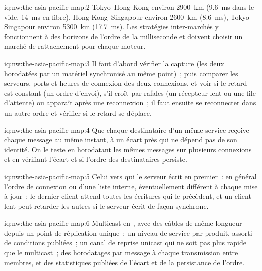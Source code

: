 \begin{solution}{iq:nw:the-asia-pacific-map:2}
Tokyo--Hong Kong environ \qty{2900}{\kilo\metre} (\qty{9.6}{\milli\second} dans le vide, \qty{14}{\milli\second} en fibre), Hong Kong--Singapour environ
\qty{2600}{\kilo\metre} (\qty{8.6}{\milli\second}), Tokyo--Singapour environ \qty{5300}{\kilo\metre} (\qty{17.7}{\milli\second}). Les stratégies inter-marchés
y fonctionnent à des horizons de l'ordre de la milliseconde et doivent choisir un marché de rattachement pour chaque moteur.
\end{solution}

\begin{solution}{iq:nw:the-asia-pacific-map:3}
Il faut d'abord vérifier la capture (les deux horodatées par un matériel synchronisé au même point)~; puis comparer les serveurs, ports et heures de connexion des deux connexions, et voir si le retard est constant (un ordre d'envoi),
s'il croît par rafales (un récepteur lent ou une file d'attente) ou apparaît après une reconnexion~; il faut ensuite se reconnecter dans un autre ordre
et vérifier si le retard se déplace.
\end{solution}

\begin{solution}{iq:nw:the-asia-pacific-map:4}
Que chaque destinataire d'un même service reçoive chaque message au même instant, à un écart près qui ne dépend pas de son identité. On le teste en horodatant
les mêmes messages sur plusieurs connexions et en vérifiant l'écart et si l'ordre des destinataires persiste.
\end{solution}

\begin{solution}{iq:nw:the-asia-pacific-map:5}
Celui vers qui le serveur écrit en premier~: en général l'ordre de connexion ou d'une liste interne, éventuellement différent à chaque mise à jour~; le dernier client
attend toutes les écritures qui le précèdent, et un client lent peut retarder les autres si le serveur écrit de façon synchrone.
\end{solution}

\begin{solution}{iq:nw:the-asia-pacific-map:6}
Multicast en , avec des câbles de même longueur depuis un point de réplication unique~; un niveau de service par produit, assorti de conditions publiées~; un
canal de reprise unicast qui ne soit pas plus rapide que le multicast~; des horodatages par message à chaque transmission entre membres, et des statistiques publiées de
l'écart et de la persistance de l'ordre.
\end{solution}
